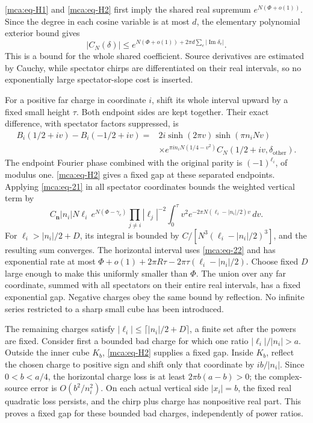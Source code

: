 \eqref{mca:eq-H1} and \eqref{mca:eq-H2} first imply the shared real
supremum \(e^{N(\Phi+o(1))}\). Since the degree in each cosine variable
is at most \(d\), the elementary polynomial exterior bound gives \begin{equation}\label{mca:eq-22}
|C_N(\delta)|\le
       e^{N(\Phi+o(1))+2\pi d\sum_e|\operatorname{Im}\delta_e|}.
\end{equation} This is a bound for the whole shared coefficient. Source derivatives
are estimated by Cauchy, while spectator chirps are differentiated on
their real intervals, so no exponentially large spectator-slope cost is
inserted.

For a positive far charge in coordinate \(i\), shift its whole interval
upward by a fixed small height \(\tau\). Both endpoint sides are kept
together. Their exact difference, with spectator factors suppressed, is
\begin{equation}\label{mca:eq-23}
\begin{split}
 B_i(1/2+iv)-B_i(-1/2+iv)
 ={}&2i\sinh(2\pi v)\sinh(\pi n_iNv)\\
 &\times e^{\pi i n_iN(1/4-v^2)}
           C_N(1/2+iv,\delta_{\mathrm{other}}).
 \end{split}
\end{equation} The endpoint Fourier phase combined with the original parity is
\((-1)^{\ell_i}\), of modulus one. \eqref{mca:eq-H2} gives a fixed gap
at these separated endpoints. Applying \eqref{mca:eq-21} in all
spectator coordinates bounds the weighted vertical term by \begin{equation}\label{mca:eq-24}
C_{\mathbf n}|n_i|N\ell_i\,
    e^{N(\Phi-\gamma_e)}\prod_{j\ne i}|\ell_j|^{-2}
       \int_0^\tau v^2e^{-2\pi N(\ell_i-|n_i|/2)v}\,dv.
\end{equation} For \(\ell_i>|n_i|/2+D\), its integral is bounded by
\(C/[N^3(\ell_i-|n_i|/2)^3]\), and the resulting sum converges. The
horizontal interval uses \eqref{mca:eq-22} and has exponential rate at
most \(\Phi+o(1)+2\pi R\tau-2\pi\tau(\ell_i-|n_i|/2)\). Choose fixed
\(D\) large enough to make this uniformly smaller than \(\Phi\). The
union over any far coordinate, summed with all spectators on their
entire real intervals, has a fixed exponential gap. Negative charges
obey the same bound by reflection. No infinite series restricted to a
sharp small cube has been introduced.

The remaining charges satisfy \(|\ell_i|\le\lceil|n_i|/2+D\rceil\), a
finite set after the powers are fixed. Consider first a bounded bad
charge for which one ratio \(|\ell_i|/|n_i|>a\). Outside the inner cube
\(K_b\), \eqref{mca:eq-H2} supplies a fixed gap. Inside \(K_b\), reflect
the chosen charge to positive sign and shift only that coordinate by
\(ib/|n_i|\). Since \(0<b<a/4\), the horizontal charge loss is at least
\(2\pi b(a-b)>0\); the complex-source error is \(O(b^2/n_i^2)\). On each
actual vertical side \(|x_i|=b\), the fixed real quadratic loss
persists, and the chirp plus charge has nonpositive real part. This
proves a fixed gap for these bounded bad charges, independently of power
ratios.

